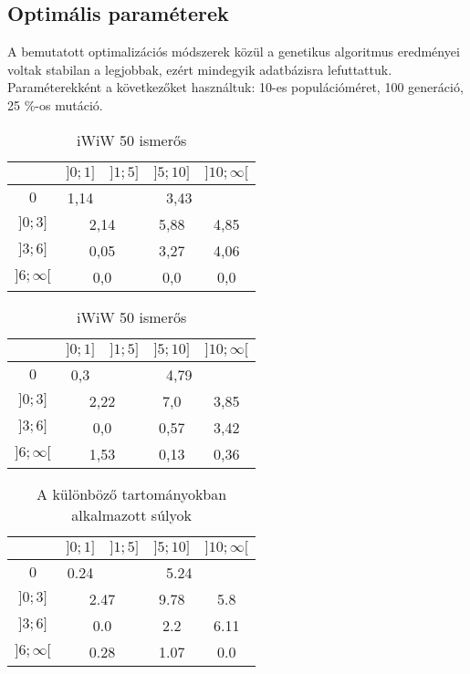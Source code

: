 \documentclass[12pt]{article}
\begin{document}
\subsection{Optimális paraméterek}
A bemutatott optimalizációs módszerek közül a genetikus algoritmus eredményei voltak stabilan a legjobbak, ezért mindegyik adatbázisra lefuttattuk. Paraméterekként a következőket használtuk: 10-es populációméret, 100 generáció, 25 \%-os mutáció.
\begin{table}[H]
	\centering
	\begin{subtable}{0.49\textwidth}
		\begin{tabular}{|c|c|c|c|c|}
			\hline
			\diagbox[width=1.5cm,height=1.2cm]{$\sigma_{cs}$}{$n_{cs}$} & $]0;1]$ & $]1;5]$ & $]5;10]$ & $]10;\infty[$  \\
			\hline
			$0$ & 1,14 & \multicolumn{3}{|c|}{3,43} \\
			\hline
			$]0;3]$ & \multicolumn{2}{|c|}{2,14} & 5,88 & 4,85 \\
			\hline
			$]3;6]$ & \multicolumn{2}{|c|}{0,05} & 3,27 & 4,06 \\
			\hline
			$]6;\infty[$  & \multicolumn{2}{|c|}{0,0} & 0,0 & 0,0 \\
			\hline
		\end{tabular}
		\caption{legjobb}
	\end{subtable}
	\begin{subtable}{0.49\textwidth}
		\begin{tabular}{|c|c|c|c|c|}
			\hline
			\diagbox[width=1.5cm,height=1.2cm]{$\sigma_{cs}$}{$n_{cs}$} & $]0;1]$ & $]1;5]$ & $]5;10]$ & $]10;\infty[$  \\
			\hline
			$0$ & 0,3 & \multicolumn{3}{|c|}{4,79} \\
			\hline
			$]0;3]$ & \multicolumn{2}{|c|}{2,22} & 7,0 & 3,85 \\
			\hline
			$]3;6]$ & \multicolumn{2}{|c|}{0,0} & 0,57 & 3,42 \\
			\hline
			$]6;\infty[$  & \multicolumn{2}{|c|}{1,53} & 0,13 & 0,36 \\
			\hline
		\end{tabular}
		\caption{0.25-ös mutációval a legjobb}
	\end{subtable}
	\caption{iWiW 50 ismerős} %
\end{table}
\begin{table}[H]
	\centering
	\begin{tabular}{|c|c|c|c|c|}
		\hline
		\diagbox{$\sigma_{cs}$}{$n_{cs}$} & $]0;1]$ & $]1;5]$ & $]5;10]$ & $]10;\infty[$  \\
		\hline
		$0$ & 0.24 & \multicolumn{3}{|c|}{5.24} \\
		\hline
		$]0;3]$ & \multicolumn{2}{|c|}{2.47} & 9.78 & 5.8 \\
		\hline
		$]3;6]$ & \multicolumn{2}{|c|}{0.0} & 2.2 & 6.11 \\
		\hline
		$]6;\infty[$  & \multicolumn{2}{|c|}{0.28} & 1.07 & 0.0 \\
		\hline
	\end{tabular}
	\caption{A különböző tartományokban alkalmazott súlyok}
\end{table}
\end{document}
